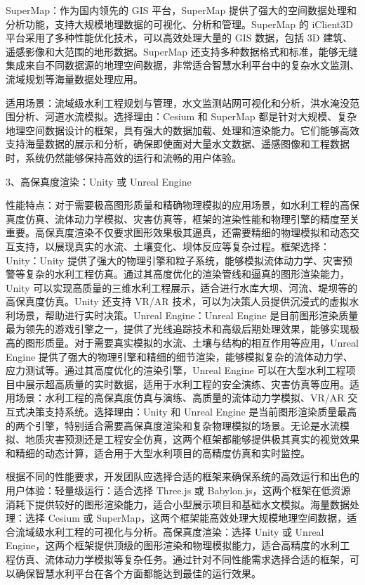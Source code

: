 SuperMap：作为国内领先的 GIS 平台，SuperMap 提供了强大的空间数据处理和分析功能，支持大规模地理数据的可视化、分析和管理。SuperMap 的 iClient3D 平台采用了多种性能优化技术，可以高效处理大量的 GIS 数据，包括 3D 建筑、遥感影像和大范围的地形数据。SuperMap 还支持多种数据格式和标准，能够无缝集成来自不同数据源的地理空间数据，非常适合智慧水利平台中的复杂水文监测、流域规划等海量数据处理应用。

适用场景：流域级水利工程规划与管理，水文监测站网可视化和分析，洪水淹没范围分析、河道水流模拟。选择理由：Cesium 和 SuperMap 都是针对大规模、复杂地理空间数据设计的框架，具有强大的数据加载、处理和渲染能力。它们能够高效支持海量数据的展示和分析，确保即使面对大量水文数据、遥感图像和工程数据时，系统仍然能够保持高效的运行和流畅的用户体验。

3、高保真度渲染：Unity 或 Unreal Engine

性能特点：对于需要极高图形质量和精确物理模拟的应用场景，如水利工程的高保真度仿真、流体动力学模拟、灾害仿真等，框架的渲染性能和物理引擎的精度至关重要。高保真度渲染不仅要求图形效果极其逼真，还需要精细的物理模拟和动态交互支持，以展现真实的水流、土壤变化、坝体反应等复杂过程。框架选择：Unity：Unity 提供了强大的物理引擎和粒子系统，能够模拟流体动力学、灾害预警等复杂的水利工程仿真。通过其高度优化的渲染管线和逼真的图形渲染能力，Unity 可以实现高质量的三维水利工程展示，适合进行水库大坝、河流、堤坝等的高保真度仿真。Unity 还支持 VR/AR 技术，可以为决策人员提供沉浸式的虚拟水利场景，帮助进行实时决策。Unreal Engine：Unreal Engine 是目前图形渲染质量最为领先的游戏引擎之一，提供了光线追踪技术和高级后期处理效果，能够实现极高的图形质量。对于需要真实模拟的水流、土壤与结构的相互作用等应用，Unreal Engine 提供了强大的物理引擎和精细的细节渲染，能够模拟复杂的流体动力学、应力测试等。通过其高度优化的渲染引擎，Unreal Engine 可以在大型水利工程项目中展示超高质量的实时数据，适用于水利工程的安全演练、灾害仿真等应用。适用场景：水利工程的高保真度仿真与演练、高质量的流体动力学模拟、VR/AR 交互式决策支持系统。选择理由：Unity 和 Unreal Engine 是当前图形渲染质量最高的两个引擎，特别适合需要高保真度渲染和复杂物理模拟的场景。无论是水流模拟、地质灾害预测还是工程安全仿真，这两个框架都能够提供极其真实的视觉效果和精细的动态计算，适合用于大型水利项目的高精度仿真和实时监控。

根据不同的性能要求，开发团队应选择合适的框架来确保系统的高效运行和出色的用户体验：轻量级运行：适合选择 Three.js 或 Babylon.js，这两个框架在低资源消耗下提供较好的图形渲染能力，适合小型展示项目和基础水文模拟。海量数据处理：选择 Cesium 或 SuperMap，这两个框架能高效处理大规模地理空间数据，适合流域级水利工程的可视化与分析。高保真度渲染：选择 Unity 或 Unreal Engine，这两个框架提供顶级的图形渲染和物理模拟能力，适合高精度的水利工程仿真、流体动力学模拟等复杂任务。通过针对不同性能需求选择合适的框架，可以确保智慧水利平台在各个方面都能达到最佳的运行效果。

